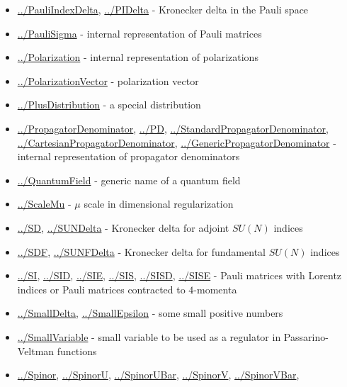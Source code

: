 \documentclass[../FeynCalcManual.tex]{subfiles}
\begin{document}
\begin{itemize}
\item
  \hyperlink{../pauliindexdelta}{../PauliIndexDelta},
  \hyperlink{../pidelta}{../PIDelta} - Kronecker delta in the Pauli
  space
\item
  \hyperlink{../paulisigma}{../PauliSigma} - internal representation of
  Pauli matrices
\item
  \hyperlink{../polarization}{../Polarization} - internal representation
  of polarizations
\item
  \hyperlink{../polarizationvector}{../PolarizationVector} -
  polarization vector
\item
  \hyperlink{../plusdistribution}{../PlusDistribution} - a special
  distribution
\item
  \hyperlink{../propagatordenominator}{../PropagatorDenominator},
  \hyperlink{../pd}{../PD},
  \hyperlink{../standardpropagatordenominator}{../StandardPropagatorDenominator},
  \hyperlink{../cartesianpropagatordenominator}{../CartesianPropagatorDenominator},
  \hyperlink{../genericpropagatordenominator}{../GenericPropagatorDenominator}
  - internal representation of propagator denominators
\item
  \hyperlink{../quantumfield}{../QuantumField} - generic name of a
  quantum field
\item
  \hyperlink{../scalemu}{../ScaleMu} - \(\mu\) scale in dimensional
  regularization
\item
  \hyperlink{../sd}{../SD}, \hyperlink{../sundelta}{../SUNDelta} -
  Kronecker delta for adjoint \(SU(N)\) indices
\item
  \hyperlink{../sdf}{../SDF}, \hyperlink{../sunfdelta}{../SUNFDelta} -
  Kronecker delta for fundamental \(SU(N)\) indices
\item
  \hyperlink{../si}{../SI}, \hyperlink{../sid}{../SID},
  \hyperlink{../sie}{../SIE}, \hyperlink{../sis}{../SIS},
  \hyperlink{../sisd}{../SISD}, \hyperlink{../sise}{../SISE} - Pauli
  matrices with Lorentz indices or Pauli matrices contracted to
  \(4\)-momenta
\item
  \hyperlink{../smalldelta}{../SmallDelta},
  \hyperlink{../smallepsilon}{../SmallEpsilon} - some small positive
  numbers
\item
  \hyperlink{../smallvariable}{../SmallVariable} - small variable to be
  used as a regulator in Passarino-Veltman functions
\item
  \hyperlink{../spinor}{../Spinor}, \hyperlink{../spinoru}{../SpinorU},
  \hyperlink{../spinorubar}{../SpinorUBar},
  \hyperlink{../spinorv}{../SpinorV},
  \hyperlink{../spinorvbar}{../SpinorVBar},

\end{itemize}
\end{document}
